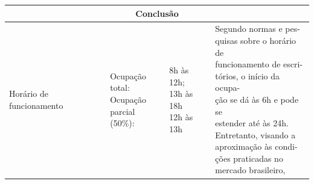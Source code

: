 \begin{table}[ht]\centering
        \begin{tabular*}{\columnwidth}{@{\extracolsep{\fill}}llll}
        \hline
        \multicolumn{4}{c}{Conclusão}\\\hline
        \multirow{2}{*}{Horário de funcionamento}                          & \makecell[l]{Ocupação\\ total:\vspace*{0,2cm}\\Ocupação \\parcial (50\%):\vspace*{0,6cm}}  & \makecell[l]{8h às 12h; \\13h às 18h \vspace*{0,6cm}\\12h às 13h} & \makecell[l]{Segundo normas e pes-\\quisas
                                                                                                                                                                                                                                                sobre o horário de\\ funcionamento de 
                                                                                                                                                                                                                                                escri-\\tórios, o início da ocupa-\\ção se 
                                                                                                                                                                                                                                                dá às 6h e pode se\\ estender até às 24h.\\ 
                                                                                                                                                                                                                                                Entretanto, visando a\\ aproximação às 
                                                                                                                                                                                                                                                condi-\\ções praticadas no\\ mercado brasileiro,\\ 
}
\end{tabular*}
\end{table}
